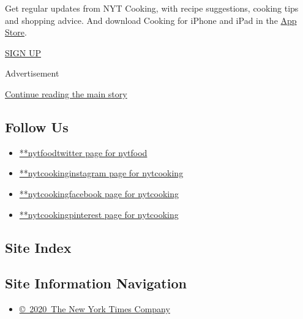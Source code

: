 Get regular updates from NYT Cooking, with recipe suggestions, cooking
tips and shopping advice. And download Cooking for iPhone and iPad in
the
\href{https://itunes.apple.com/us/app/nyt-cooking-recipes-from-new/id911422904?mt=8}{App
Store}.

\href{/newsletters/signup/CK}{SIGN UP}

Advertisement

\protect\hyperlink{after-mktg}{Continue reading the main story}

\hypertarget{follow-us}{%
\subsection{Follow Us}\label{follow-us}}

\begin{itemize}
\tightlist
\item
  \href{https://twitter.com/nytfood}{**nytfoodtwitter page for nytfood}
\item
  \href{https://instagram.com/nytcooking}{**nytcookinginstagram page for
  nytcooking}
\item
  \href{https://www.facebook.com/nytcooking}{**nytcookingfacebook page
  for nytcooking}
\item
  \href{https://pinterest.com/nytcooking}{**nytcookingpinterest page for
  nytcooking}
\end{itemize}

\hypertarget{site-index}{%
\subsection{Site Index}\label{site-index}}

\hypertarget{site-information-navigation}{%
\subsection{Site Information
Navigation}\label{site-information-navigation}}

\begin{itemize}
\tightlist
\item
  \href{https://help.nytimes.com/hc/en-us/articles/115014792127-Copyright-notice}{©~2020~The
  New York Times Company}
\end{itemize}

